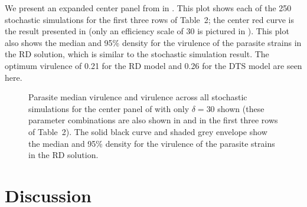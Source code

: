 We present an expanded center panel from  in . This plot shows each of the 250 stochastic simulations for the first three rows of Table~2; the center red curve is the result presented in  (only an efficiency scale of 30 is pictured in ). This plot also shows the median and 95\% density for the virulence of the parasite strains in the RD solution, which is similar to the stochastic simulation result. The optimum virulence of 0.21 for the RD model and 0.26 for the DTS model are seen here.

\begin{figure}[H]
\caption{Parasite median virulence and virulence across all stochastic simulations for the center panel of  with only $\delta = 30$ shown (these parameter combinations are also shown in  and in the first three rows of Table~2). The solid black curve and shaded grey envelope show the median and 95\% density for the virulence of the parasite strains in the RD solution.} 
\label{fig:DTS2}
\end{figure} 
\clearpage

\section*{Discussion}

